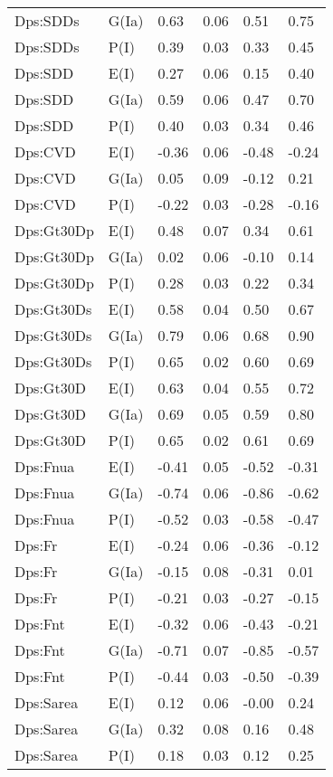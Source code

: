 \begin{center}
\begin{longtable}{|p{1.1in}|p{0.7in}|p{0.7in}|p{0.6in}|p{0.6in}|p{0.6in}|}
  Dps:SDDs & G(Ia) & 0.63 & 0.06 & 0.51 & 0.75 \\ 
  Dps:SDDs & P(I) & 0.39 & 0.03 & 0.33 & 0.45 \\ 
  Dps:SDD & E(I) & 0.27 & 0.06 & 0.15 & 0.40 \\ 
  Dps:SDD & G(Ia) & 0.59 & 0.06 & 0.47 & 0.70 \\ 
  Dps:SDD & P(I) & 0.40 & 0.03 & 0.34 & 0.46 \\ 
  Dps:CVD & E(I) & -0.36 & 0.06 & -0.48 & -0.24 \\ 
  Dps:CVD & G(Ia) & 0.05 & 0.09 & -0.12 & 0.21 \\ 
  Dps:CVD & P(I) & -0.22 & 0.03 & -0.28 & -0.16 \\ 
  Dps:Gt30Dp & E(I) & 0.48 & 0.07 & 0.34 & 0.61 \\ 
  Dps:Gt30Dp & G(Ia) & 0.02 & 0.06 & -0.10 & 0.14 \\ 
  Dps:Gt30Dp & P(I) & 0.28 & 0.03 & 0.22 & 0.34 \\ 
  Dps:Gt30Ds & E(I) & 0.58 & 0.04 & 0.50 & 0.67 \\ 
  Dps:Gt30Ds & G(Ia) & 0.79 & 0.06 & 0.68 & 0.90 \\ 
  Dps:Gt30Ds & P(I) & 0.65 & 0.02 & 0.60 & 0.69 \\ 
  Dps:Gt30D & E(I) & 0.63 & 0.04 & 0.55 & 0.72 \\ 
  Dps:Gt30D & G(Ia) & 0.69 & 0.05 & 0.59 & 0.80 \\ 
  Dps:Gt30D & P(I) & 0.65 & 0.02 & 0.61 & 0.69 \\ 
  Dps:Fnua & E(I) & -0.41 & 0.05 & -0.52 & -0.31 \\ 
  Dps:Fnua & G(Ia) & -0.74 & 0.06 & -0.86 & -0.62 \\ 
  Dps:Fnua & P(I) & -0.52 & 0.03 & -0.58 & -0.47 \\ 
  Dps:Fr & E(I) & -0.24 & 0.06 & -0.36 & -0.12 \\ 
  Dps:Fr & G(Ia) & -0.15 & 0.08 & -0.31 & 0.01 \\ 
  Dps:Fr & P(I) & -0.21 & 0.03 & -0.27 & -0.15 \\ 
  Dps:Fnt & E(I) & -0.32 & 0.06 & -0.43 & -0.21 \\ 
  Dps:Fnt & G(Ia) & -0.71 & 0.07 & -0.85 & -0.57 \\ 
  Dps:Fnt & P(I) & -0.44 & 0.03 & -0.50 & -0.39 \\ 
  Dps:Sarea & E(I) & 0.12 & 0.06 & -0.00 & 0.24 \\ 
  Dps:Sarea & G(Ia) & 0.32 & 0.08 & 0.16 & 0.48 \\ 
  Dps:Sarea & P(I) & 0.18 & 0.03 & 0.12 & 0.25 \\ 

\end{longtable}
\end{center}
